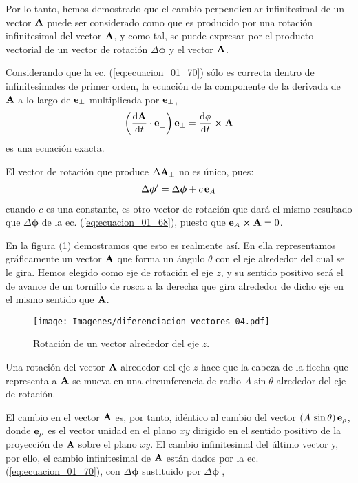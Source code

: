 Por lo tanto, hemos demostrado que el cambio perpendicular infinitesimal de un vector $\vb{A}$ puede ser considerado como que es producido por una rotación infinitesimal del vector $\vb{A}$, y como tal, se puede expresar por el producto vectorial de un vector de rotación $\Delta \bm{\phi}$ y el vector $\vb{A}$. 
\par
Considerando que la ec. (\ref{eq:ecuacion_01_70}) sólo es correcta dentro de infinitesimales de primer orden, la ecuación de la componente de la derivada de $\vb{A}$ a lo largo de $\vb{e}_{\perp}$ multiplicada por $\vb{e}_{\perp}$,
\begin{align}
    \left( \dv{\vb{A}}{t} \cdot \vb{e}_{\perp} \right) \vb{e}_{\perp} = \dv{\phi}{t} \cp \vb{A}
    \label{eq:ecuacion_01_71}
\end{align}
es una ecuación exacta.
\par
El vector de rotación que produce $\Delta \vb{A}_{\perp}$ no es único, pues:
\begin{align*}
    \Delta \bm{\phi}^{\prime} = \Delta \bm{\phi} + c \, \vb{e}_{A} 
\end{align*}
cuando $c$ es una constante, es otro vector de rotación que dará el mismo resultado que $\Delta \bm{\phi}$ de la ec. (\ref{eq:ecuacion_01_68}), puesto que $\vb{e}_{A} \cp \vb{A} = 0$. 
\par
En la figura (\ref{fig:figura_01_22}) demostramos que esto es realmente así. En ella representamos gráficamente un vector $\vb{A}$ que forma un ángulo $\theta$ con el eje alrededor del cual se le gira. Hemos elegido como eje de rotación el eje $z$, y su sentido positivo será el de avance de un tornillo de rosca a la derecha que gira alrededor de dicho eje en el mismo sentido que $\vb{A}$.
\begin{figure}[H]
    \centering
    \texttt{[image: Imagenes/diferenciacion\_vectores\_04.pdf]}
    \caption{Rotación de un vector alrededor del eje $z$.}
    \label{fig:figura_01_22}
\end{figure}
Una rotación del vector $\vb{A}$ alrededor del eje $z$ hace que la cabeza de la flecha que representa a $\vb{A}$ se mueva en una circunferencia de radio $A \sin \theta$ alrededor del eje de rotación.
\par
El cambio en el vector $\vb{A}$ es, por tanto, idéntico al cambio del vector $\left( A \, \sin \theta \right) \vb{e}_{\rho}$, donde $\vb{e}_{\rho}$ es el vector unidad en el plano $x y$ dirigido en el sentido positivo de la proyección de $\vb{A}$ sobre el plano $x y$. El cambio infinitesimal del último vector y, por ello, el cambio infinitesimal de $\vb{A}$ están dados por la ec. (\ref{eq:ecuacion_01_70}), con $\Delta \bm{\phi}$ sustituido por $\Delta \bm{\phi}^{\prime}$,
